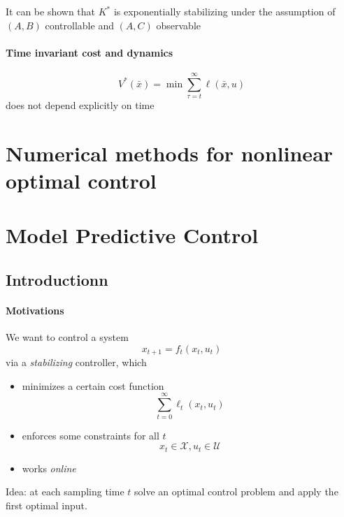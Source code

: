 \documentclass{book}
\theoremstyle{definition}
\theoremstyle{remark}
\theoremstyle{remark}
\begin{document}
It can be shown that $K^*$ is exponentially stabilizing under the assumption of $(A,B)$ controllable and $(A,C)$ observable

\subsubsection{Time invariant cost and dynamics} %

\[
    V^*(\bar{x})= \min \displaystyle\sum_{\tau=t}^{\infty}\ell(\bar{x},u)
\]
does not depend explicitly on time


















\chapter{Numerical methods for nonlinear optimal control}




\chapter{Model Predictive Control}
\section{Introductionn}
\subsubsection{Motivations}
We want to control a system 
\[
    x_{t+1} = f_t(x_t,u_t)
\]
via a \emph{stabilizing} controller, which
\begin{itemize}
    \item minimizes a certain cost function \[
            \displaystyle\sum_{t=0}^{\infty}\ell_t(x_t,u_t)
        \]
    \item enforces some constraints for all $t$ 
        \[
            x_t \in \mathcal{X}, u_t \in \mathcal{U}
        \]
    \item works \emph{online}
\end{itemize}
Idea: at each sampling time $t$ solve an optimal control problem and apply the first optimal input.
\end{document}
